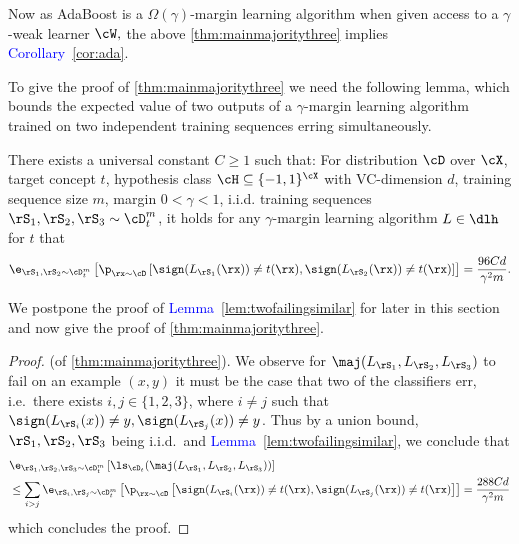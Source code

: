Now as AdaBoost is a $ \Omega(\gamma)$-margin learning algorithm when given access to a $ \gamma $-weak learner $ \cW,$ the above \cref{thm:mainmajoritythree} implies \textcolor{blue}{Corollary}~\ref{cor:ada}.

To give the proof of \cref{thm:mainmajoritythree} we need the following lemma, which bounds the expected value of two outputs of a $ \gamma $-margin learning algorithm trained on two independent training sequences erring simultaneously. 

\begin{lemma}\label{lem:twofailingsimilar}
    There exists a universal constant $ C\geq1 $ such that: For distribution $ \cD $ over $ \cX $, target concept $ t $,  hypothesis class $ \cH \subseteq \{-1,1  \}^{\cX} $ with VC-dimension $ d $,  training sequence size $ m $, margin $ 0<\gamma<1 $, i.i.d. training sequences $ \rS_{1},\rS_{2},\rS_{3}\sim \cD_{t}^{m} $, it holds for any $ \gamma $-margin learning algorithm $ L\in \dlh $ for $ t $  that  
    \begin{align*}
    \e_{\rS_{1},\rS_{2}\sim \cD^{m}_{t}}\left[\p_{\rx\sim\cD}\left[   \sign(L_{\rS_{1}}(\rx))\not=t(\rx),\sign(L_{\rS_{2}}(\rx))\not=t(\rx)\right]\right] =\frac{96Cd}{\gamma^{2}m}.
    \end{align*}
\end{lemma}

We postpone the proof of \textcolor{blue}{Lemma}~\ref{lem:twofailingsimilar} for later in this section and now give the proof of \cref{thm:mainmajoritythree}.

\begin{proof}(of \cref{thm:mainmajoritythree}).
We observe for $ \maj(L_{\rS_{1}},L_{\rS_{2}},L_{\rS_{3}}) $ to fail on an example $ (x,y) $ it must be the case that two of the classifiers err, i.e.\ there exists $ i,j\in\{1,2,3  \}  $, where $ i\not=j $   such that $ \sign(L_{\rS_{i}}(x))\not=y,\sign(L_{\rS_{j}}(x))\not=y $. Thus by a union bound, $ \rS_{1},\rS_{2},\rS_{3} $ being i.i.d.\ and \textcolor{blue}{Lemma}~\ref{lem:twofailingsimilar}, we conclude that
\begin{align*}
    &\e_{\rS_{1},\rS_{2},\rS_{3}\sim \cD^{m}_{t}}\left[\ls_{\cD_{t}}(\maj(L_{\rS_{1}},L_{\rS_{2}},L_{\rS_{3}}))\right]
    \\
    &\leq \sum_{i>j}\e_{\rS_{i},\rS_{j}\sim \cD^{m}_{t}}\left[\p_{\rx\sim\cD}\left[   \sign(L_{\rS_{i}}(\rx))\not=t(\rx),\sign(L_{\rS_{j}}(\rx))\not=t(\rx)\right]\right]
    =\frac{288Cd}{\gamma^{2}m}
\end{align*} 
which concludes the proof. 
\end{proof}

